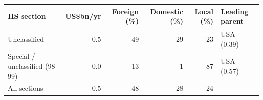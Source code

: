 \begin{tabular}{@{}p{7.2cm} r r r r l@{}}
\toprule
HS section & US\$bn/yr & Foreign (\%) & Domestic (\%) & Local (\%) & Leading parent \\
\midrule
Unclassified & 0.5 & 49 & 29 & 23 & USA (0.39) \\
Special / unclassified (98-99) & 0.0 & 13 & 1 & 87 & USA (0.57) \\
\midrule
All sections & 0.5 & 48 & 28 & 24 & \\
\bottomrule
\end{tabular}
